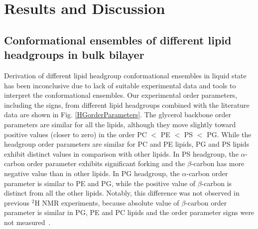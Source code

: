 \documentclass[aps,prl,superscriptaddress,twocolumn]{revtex4}
\begin{document}
\clearpage
\section{Results and Discussion}

\subsection{Conformational ensembles of different lipid headgroups in bulk bilayer}

Derivation of different lipid headgroup conformational ensembles in liquid state has been
inconclusive due to lack of suitable experimental data and tools to interpret the conformational ensembles.
Our experimental order parameters, including the signs, from different lipid headgroups
combined with the literature data are shown in Fig. \ref{HGorderParameters}.
The glycerol backbone order parameters are similar for all the lipids, although they move slightly toward
positive values (closer to zero) in the order PC $<$ PE $<$ PS $<$ PG. 
While the headgroup order parameters are similar for PC and PE lipids,
PG and PS lipids exhibit distinct values in comparison with other lipids.
In PS headgroup, the $\alpha$-carbon order parameter exhibits significant forking and
the $\beta$-carbon has more negative value than in other lipids.
In PG headgroup, the $\alpha$-carbon order parameter is similar to PE and PG,
while the positive value of $\beta$-carbon is distinct from all the other lipids.
Notably, this difference was not observed in previous $^2$H NMR experiments,
because absolute value of $\beta$-carbon order parameter is similar in PG, PE and PC lipids and the order parameter
signs were not measured~\cite{wohlgemuth80,gally81,borle85}.

\end{document}
